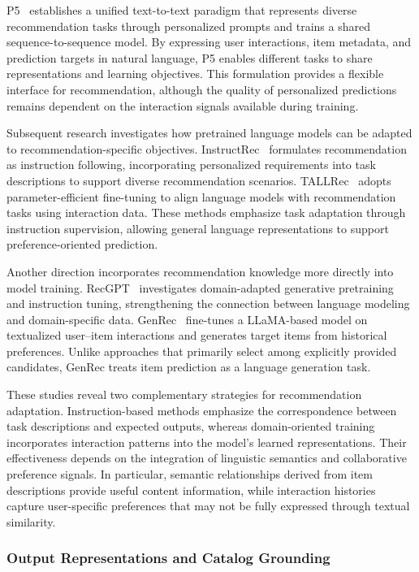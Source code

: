 \documentclass[sigconf,nonacm]{acmart}
\begin{document}
P5~\cite{p5} establishes a unified text-to-text paradigm
that represents diverse recommendation tasks through personalized
prompts and trains a shared sequence-to-sequence model.
By expressing user interactions, item metadata, and prediction
targets in natural language, P5 enables different tasks to share
representations and learning objectives. This formulation
provides a flexible interface for recommendation, although
the quality of personalized predictions remains dependent on
the interaction signals available during training.

Subsequent research investigates how pretrained language models
can be adapted to recommendation-specific objectives.
InstructRec~\cite{instructrec} formulates recommendation as
instruction following, incorporating personalized requirements
into task descriptions to support diverse recommendation
scenarios. TALLRec~\cite{tallrec} adopts parameter-efficient
fine-tuning to align language models with recommendation
tasks using interaction data. These methods emphasize task
adaptation through instruction supervision, allowing general
language representations to support preference-oriented
prediction.

Another direction incorporates recommendation knowledge
more directly into model training. RecGPT~\cite{recgpt}
investigates domain-adapted generative pretraining
and instruction tuning, strengthening the connection between
language modeling and domain-specific data.
GenRec~\cite{genrec} fine-tunes a LLaMA-based model on
textualized user--item interactions and generates target items
from historical preferences. Unlike approaches that primarily
select among explicitly provided candidates, GenRec treats
item prediction as a language generation task.

These studies reveal two complementary strategies for
recommendation adaptation. Instruction-based methods emphasize
the correspondence between task descriptions and expected
outputs, whereas domain-oriented training incorporates
interaction patterns into the model's learned representations.
Their effectiveness depends on the integration of linguistic
semantics and collaborative preference signals. In particular,
semantic relationships derived from item descriptions provide
useful content information, while interaction histories capture
user-specific preferences that may not be fully expressed
through textual similarity.

\subsubsection{Output Representations and Catalog Grounding}
\end{document}

